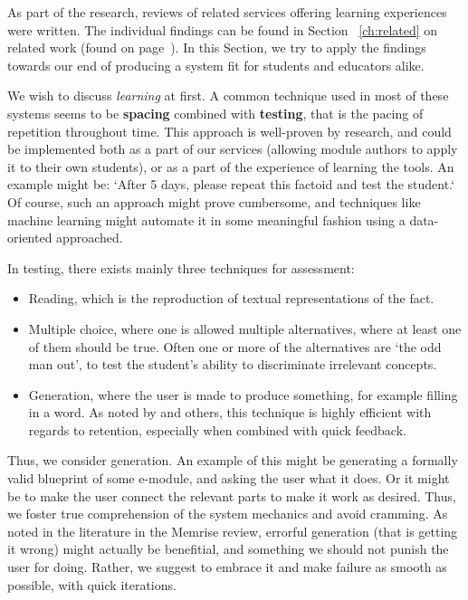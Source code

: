 As part of the research, reviews of related services offering learning
experiences were written. The individual findings can be found in Section
~\ref{ch:related} on related work (found on page~\pageref{ch:related}). In this
Section, we try to apply the findings towards our end of producing a system fit
for students and educators alike.

We wish to discuss \textit{learning} at first. A common technique used in most
of these systems seems to be \textbf{spacing} combined with \textbf{testing},
that is the pacing of repetition throughout time. This approach is well-proven
by research, and could be implemented both as a part of our services (allowing
module authors to apply it to their own students), or as a part of the
experience of learning the tools. An example might be: `After 5 days, please
repeat this factoid and test the student.` Of course, such an approach might
prove cumbersome, and techniques like machine learning might automate it in some
meaningful fashion using a data-oriented approached.

In testing, there exists mainly three techniques for assessment:

\begin{itemize}
\item Reading, which is the reproduction of textual representations of the fact.
\item Multiple choice, where one is allowed multiple alternatives, where at
least one of them should be true. Often one or more of the alternatives are `the
odd man out', to test the student's ability to discriminate irrelevant concepts.
\item Generation, where the user is made to produce something, for example
filling in a word. As noted by \cite{potts2014benefit} and others, this
technique is highly efficient with regards to retention, especially when
combined with quick feedback.
\end{itemize}

Thus, we consider generation. An example of this might be generating a formally
valid blueprint of some e-module, and asking the user what it does. Or it might
be to make the user connect the relevant parts to make it work as desired. Thus,
we foster true comprehension of the system mechanics and avoid cramming. As
noted in the literature in the Memrise review, errorful generation (that is
getting it wrong) might actually be benefitial, and something we should not
punish the user for doing. Rather, we suggest to embrace it and make failure as
smooth as possible, with quick iterations.

